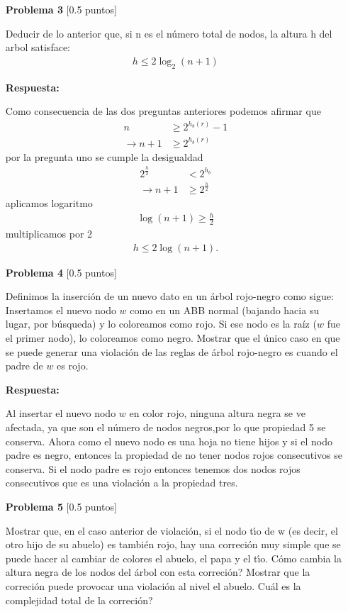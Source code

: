 \documentclass[11pt]{article}
\begin{document}
\begin{itemize}
 \item [\textbf{Problema 3}] [0.5 puntos]

Deducir de lo anterior que, si n es el número total de nodos, la altura h del arbol satisface:
\begin{align*}
h\leq2\log_2(n+1)
\end{align*}

\textbf{Respuesta:}

Como consecuencia de las dos preguntas anteriores podemos afirmar que
\begin{align*}
   n&\geq2^{h_b(r)}-1
  \\ \xrightarrow{}  n+1&\geq2^{h_b(r)}
\end{align*}
 por la pregunta uno se cumple la desigualdad
\begin{align*}
    2^{\frac{h}{2}}&<2^{h_b} 
   \\ \xrightarrow{} n+1&\geq 2^{\frac{h}{2}}
\end{align*}
aplicamos logaritmo
\begin{align*}
\log(n+1)\geq \frac{h}{2}
\end{align*}
multiplicamos por 2
\begin{align*}
h\leq 2 \log(n+1).
\end{align*}

\item [\textbf{Problema 4}] [0.5 puntos]

Definimos la inserción de un nuevo dato en un árbol rojo-negro como sigue: Insertamos el nuevo nodo
$w$ como en un ABB normal (bajando hacia su lugar, por búsqueda) y lo coloreamos como rojo. Si
ese nodo es la raíz ($w$ fue el primer nodo), lo coloreamos como negro. Mostrar que el único caso en
que se puede generar una violación de las reglas de árbol rojo-negro es cuando el padre de $w$ es rojo.

\textbf{Respuesta:}

Al insertar el nuevo nodo $w$ en color rojo, ninguna altura negra se ve afectada, ya que son el número de nodos negros,por lo que propiedad 5 se conserva. Ahora como el nuevo nodo es una hoja no tiene hijos y si el nodo padre es negro, entonces la propiedad de no tener nodos rojos consecutivos se conserva. Si el nodo padre es rojo entonces tenemos dos nodos rojos consecutivos que es una violación a la propiedad tres.

\item [\textbf{Problema 5}] [0.5 puntos]

 Mostrar que, en el caso anterior de violación, si el nodo tı́o de w (es decir, el otro hijo de su abuelo)
es también rojo, hay una correción muy simple que se puede hacer al cambiar de colores el abuelo, el
papa y el tı́o. Cómo cambia la altura negra de los nodos del árbol con esta correción? Mostrar que la
correción puede provocar una violación al nivel el abuelo. Cuál es la complejidad total de la correción?


\end{itemize}
\end{document}

